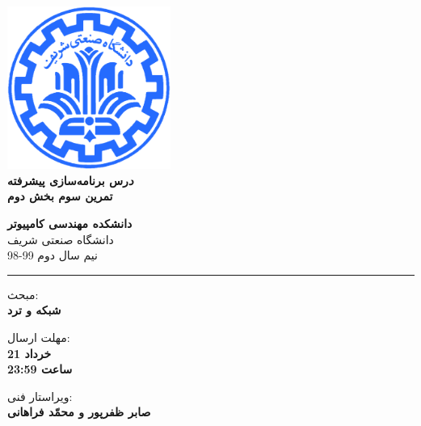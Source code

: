 \documentclass[]{article}
\begin{document}
\begin{titlepage}
\begin{center}
        
\vspace*{0.7cm}

\includegraphics[width=0.4\textwidth]{sharif1.png}\\
\vspace{0.5cm}
\textbf{ \Huge{\emph درس برنامه‌سازی پیشرفته} }\\
\vspace{0.5cm}
\textbf{ \Large{ تمرین سوم بخش دوم} }
\vspace{0.2cm}
       
 
      \large \textbf{دانشکده مهندسی کامپیوتر}\\\vspace{0.2cm}
    \large   دانشگاه صنعتی شریف\\\vspace{0.2cm}
       \large   ﻧﯿﻢ سال دوم 99-98 \\\vspace{0.2cm}
      \noindent\rule[1ex]{\linewidth}{1pt}
    مبحث:\\
    \textbf{{شبکه و ترد}}

    \vspace{0.20cm}

   مهلت ارسال:\\
    \textbf{{21 خرداد}}\\
    \textbf{{ساعت 23:59}}

    \vspace{0.15cm}
ویراستار فنی:\\
    \textbf{{صابر ظفر‌پور و محمّد فراهانی}}
\end{center}
\end{titlepage}


\newpage
\pagestyle{fancy}
\fancyhf{}
\fancyfoot{}
\cfoot{\thepage}
\end{document}
